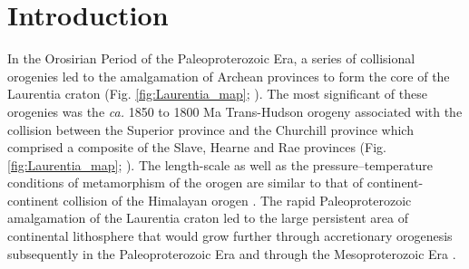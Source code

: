 \documentclass[draft]{agujournal2019}
\begin{document}
%
%
%
%


\section{Introduction} 

In the Orosirian Period of the Paleoproterozoic Era, a series of collisional orogenies led to the amalgamation of Archean provinces to form the core of the Laurentia craton (Fig. \ref{fig:Laurentia_map}; ). The most significant of these orogenies was the \textit{ca.} 1850 to 1800 Ma Trans-Hudson orogeny associated with the collision between the Superior province and the Churchill province which comprised a composite of the Slave, Hearne and Rae provinces (Fig. \ref{fig:Laurentia_map}; ). The length-scale as well as the pressure–temperature conditions of metamorphism of the orogen are similar to that of continent-continent collision of the Himalayan orogen \cite{Weller2017a}. The rapid Paleoproterozoic amalgamation of the Laurentia craton led to the large persistent area of continental lithosphere that would grow further through accretionary orogenesis subsequently in the Paleoproterozoic Era and through the Mesoproterozoic Era \cite{Whitmeyer2007a}. 
\end{document}
